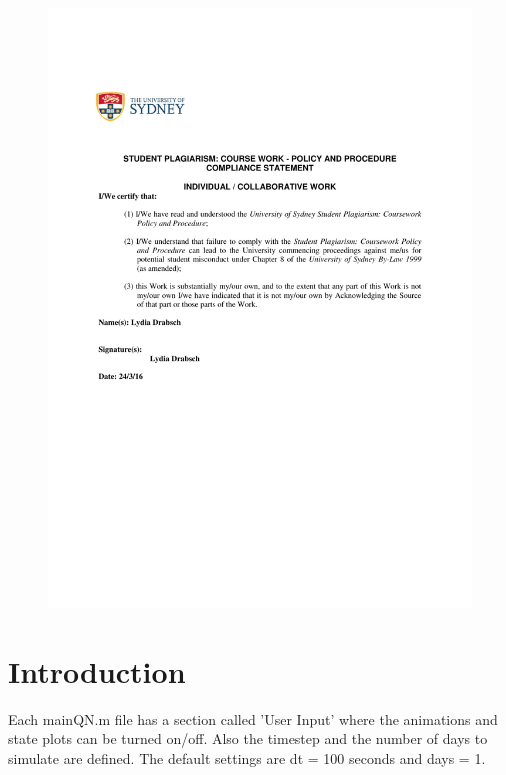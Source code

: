 \documentclass[11pt,a4paper]{article}
\renewcommand{\thepage}{\roman{page}}
\renewcommand{\thepage}{\roman{page}}
\begin{document}
\begin{figure}[h!]
\centering
\includegraphics[width=0.99\linewidth]{./Plag}
\label{fig:Plag}
\end{figure}

\setcounter{section}{0}

\tableofcontents
\listoffigures
\listoftables
\newpage
{}




\section*{Introduction}
Each mainQN.m file has a section called 'User Input' where the animations and state plots can be turned on/off. Also the timestep and the number of days to simulate are defined. The default settings are dt = 100 seconds and days = 1.
\end{document}
